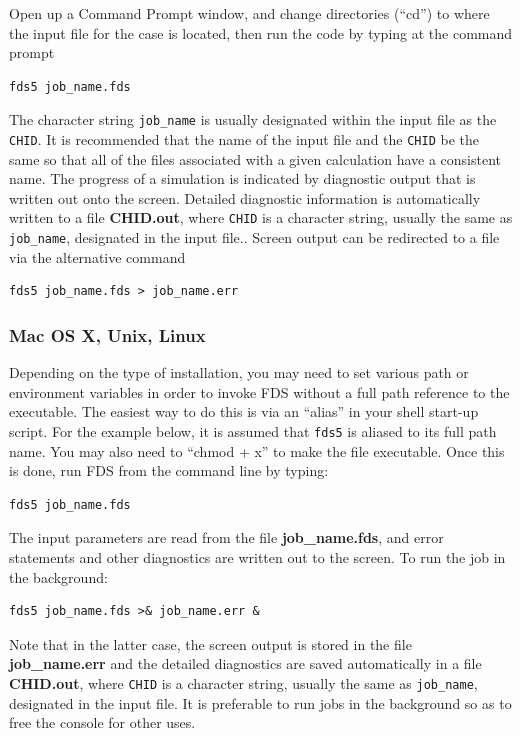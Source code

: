 \documentclass[11pt]{book}
\newcommand{\ct}{\tt\small}
\begin{document}
Open up a Command Prompt window, and change directories (``cd'') to where the
input file for the case is located, then run the code by typing at the command prompt
\begin{verbatim}
fds5 job_name.fds
\end{verbatim}
The character string {\ct job\_name} is usually
designated within the input file as the {\ct CHID}. It is recommended that the
name of the input file and the {\ct CHID} be the same so that all of the
files associated with a given calculation have a consistent name.
The progress of a simulation is indicated by diagnostic output that is written out onto the screen.
Detailed diagnostic information is automatically
written to a file {\bf CHID.out}, where {\ct CHID} is a character
string, usually the same as {\ct job\_name}, designated in the input file..
Screen output can be redirected to a file via the alternative command
\begin{verbatim}
fds5 job_name.fds > job_name.err
\end{verbatim}



\subsubsection{Mac OS X, Unix, Linux}

Depending on the type of installation, you may need to set various path or environment variables in order to invoke
FDS without a full path reference to the executable. The easiest way to do this is via an ``alias'' in your shell start-up
script. For the example below, it is assumed that {\ct fds5} is aliased to its full path name.
You may also need to ``chmod + x'' to make the file executable. Once this is done, run FDS from the command line by typing:
\begin{verbatim}
fds5 job_name.fds
\end{verbatim}
The input parameters are read from the file {\bf job\_name.fds},
and error statements and other diagnostics are written out to the screen.
To run the job in the background:
\begin{verbatim}
fds5 job_name.fds >& job_name.err &
\end{verbatim}


Note that in the latter case, the screen output is stored in the file {\bf job\_name.err} and the
detailed diagnostics are saved automatically in a file {\bf CHID.out}, where {\ct CHID} is a character
string, usually the same as {\ct job\_name}, designated in the input file.
It is preferable to run jobs in the background so as to free the console for other uses.
\end{document}
